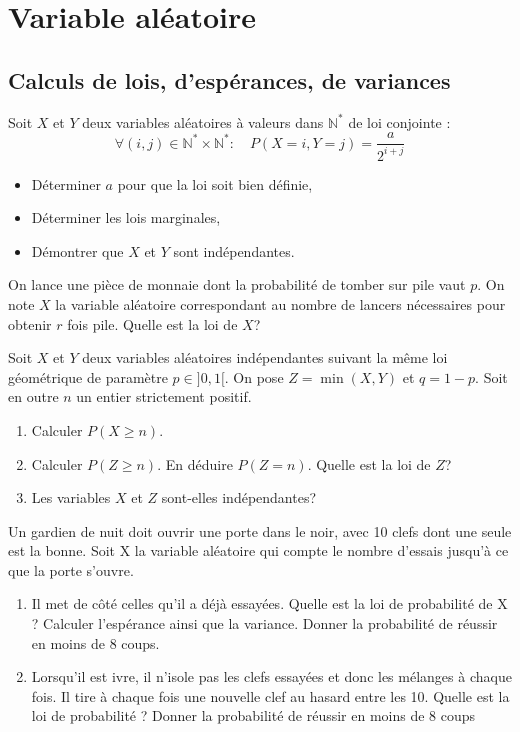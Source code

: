 \documentclass{book}
\begin{document}
\section*{Variable aléatoire}
\subsection*{Calculs de lois, d'espérances, de variances}
\begin{Exercice}
Soit $X$ et $Y$ deux variables aléatoires à valeurs dans  $\mathbb{N}^*$ de loi conjointe :
$$\forall (i,j)\in \mathbb{N}^*\times\mathbb{N}^*:\quad   P(X=i,Y=j)=\frac{a}{2^{i+j}}$$
\begin{itemize}
\item Déterminer $a$ pour que la loi soit bien définie,
\item Déterminer les lois marginales,
\item Démontrer que $X$ et $Y$ sont indépendantes. 
\end{itemize}
\end{Exercice}
  
\begin{Exercice}
On lance une pièce de monnaie dont la probabilité de tomber sur pile vaut $p$.
On note $X$ la variable aléatoire correspondant au nombre de lancers nécessaires pour obtenir
$r$ fois pile. Quelle est la loi de $X$?
\end{Exercice}

\begin{Exercice}
Soit $X$ et $Y$ deux variables aléatoires indépendantes suivant la même loi géométrique de paramètre $p\in ]0,1[$. On pose $Z=\min(X,Y)$ et $q=1-p$. Soit en outre $n$ un entier strictement positif.
\begin{enumerate}
\item Calculer $P(X\geq n)$.
\item Calculer $P(Z\geq n)$. En déduire $P(Z=n)$. Quelle est la loi de $Z$?
\item Les variables $X$ et $Z$ sont-elles indépendantes?
\end{enumerate}
\end{Exercice}

\begin{Exercice}[Gardien]
Un gardien de nuit doit ouvrir une porte dans le noir, avec 10 clefs dont
une seule est la bonne. Soit X la variable aléatoire qui compte le nombre
d'essais jusqu'à ce que la porte s'ouvre.
\begin{enumerate}
\item Il met de côté celles qu'il a déjà essayées. Quelle est la loi de
probabilité de X ? Calculer l'espérance ainsi que la variance. Donner la
probabilité de réussir en moins de 8 coups.
\item Lorsqu'il est ivre, il n'isole pas les clefs essayées et donc les mélanges à
chaque fois. Il tire à chaque fois une nouvelle clef au hasard entre les
10. Quelle est la loi de probabilité ? Donner la probabilité de réussir en
moins de 8 coups
\end{enumerate}
\end{Exercice}
\end{document}
